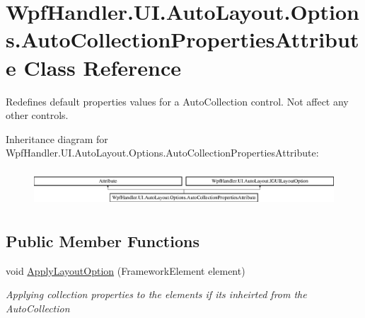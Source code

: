 \hypertarget{class_wpf_handler_1_1_u_i_1_1_auto_layout_1_1_options_1_1_auto_collection_properties_attribute}{}\section{Wpf\+Handler.\+U\+I.\+Auto\+Layout.\+Options.\+Auto\+Collection\+Properties\+Attribute Class Reference}
\label{class_wpf_handler_1_1_u_i_1_1_auto_layout_1_1_options_1_1_auto_collection_properties_attribute}


Redefines default properties values for a Auto\+Collection control. Not affect any other controls.  


Inheritance diagram for Wpf\+Handler.\+U\+I.\+Auto\+Layout.\+Options.\+Auto\+Collection\+Properties\+Attribute\+:\begin{figure}[H]
\begin{center}
\leavevmode
\includegraphics[height=1.372549cm]{d7/de8/class_wpf_handler_1_1_u_i_1_1_auto_layout_1_1_options_1_1_auto_collection_properties_attribute}
\end{center}
\end{figure}
\subsection*{Public Member Functions}
\begin{DoxyCompactItemize}
\item 
void \mbox{\hyperlink{class_wpf_handler_1_1_u_i_1_1_auto_layout_1_1_options_1_1_auto_collection_properties_attribute_aaff2195c793c7e75ac553291d9189655}{Apply\+Layout\+Option}} (Framework\+Element element)
\begin{DoxyCompactList}\small\item\em Applying collection properties to the elements if it\textquotesingle{}s inheirted from the Auto\+Collection \end{DoxyCompactList}\end{DoxyCompactItemize}
